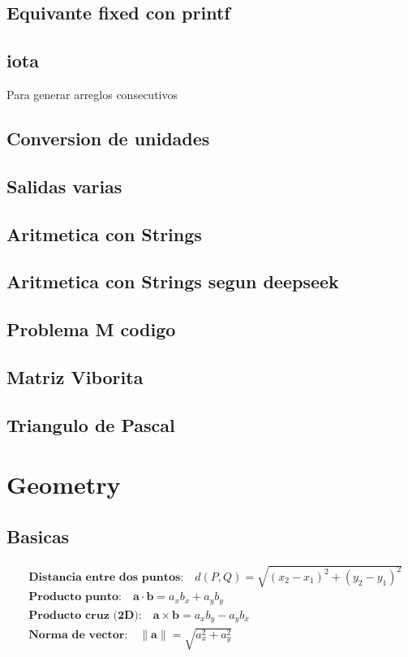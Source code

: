 \documentclass[10pt,landscape,twocolumn,a4paper,notitlepage]{article}
\begin{document}
\subsection{Equivante fixed con printf}
\subsection{iota}
Para generar arreglos consecutivos
\subsection{Conversion de unidades}
\subsection{Salidas varias}
\subsection{Aritmetica con Strings}
\subsection{Aritmetica con Strings segun deepseek}
\subsection{Problema M codigo}
\subsection{Matriz Viborita}
\subsection{Triangulo de Pascal}

\section{Geometry}
\subsection{Basicas}
\begin{align}
  &\textbf{Distancia entre dos puntos:} \quad d(P,Q)=\sqrt{(x_2-x_1)^2+(y_2-y_1)^2} \\
  &\textbf{Producto punto:} \quad \mathbf{a}\cdot\mathbf{b}=a_x b_x + a_y b_y \\
  &\textbf{Producto cruz (2D):} \quad \mathbf{a}\times\mathbf{b}=a_x b_y - a_y b_x \\
  &\textbf{Norma de vector:} \quad \|\mathbf{a}\|=\sqrt{a_x^2+a_y^2}
\end{align}
\end{document}
